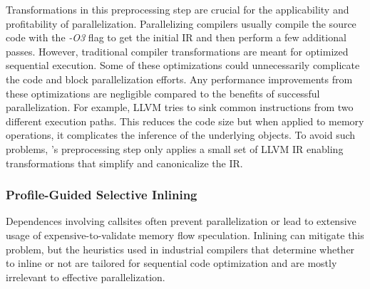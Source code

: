 Transformations in this preprocessing step are crucial for the
applicability and profitability of parallelization.
%
Parallelizing compilers usually compile the source code with the \textit{-O3}
flag to get the initial IR and then perform a few additional
passes.
However, traditional compiler transformations are meant for optimized
sequential execution.
%
Some of these optimizations could unnecessarily complicate the code
and block parallelization efforts.
%
Any performance improvements from these optimizations are negligible
compared to the benefits of successful parallelization.
%
For example, LLVM tries to sink common instructions from two different
execution paths. This reduces the code size but when applied to memory
operations, it complicates the inference of the underlying objects.
%
To avoid such problems, \namensp 's preprocessing step only applies a
small set of LLVM IR enabling transformations that simplify and
canonicalize the IR.



\subsubsection{Profile-Guided Selective Inlining}

%
Dependences involving callsites often prevent parallelization or lead
to extensive usage of expensive-to-validate memory flow speculation.
%
Inlining can mitigate this problem, but the heuristics used in
industrial compilers that determine whether to inline or not are tailored
for sequential code optimization and are mostly irrelevant to
effective parallelization.
%
%
%

